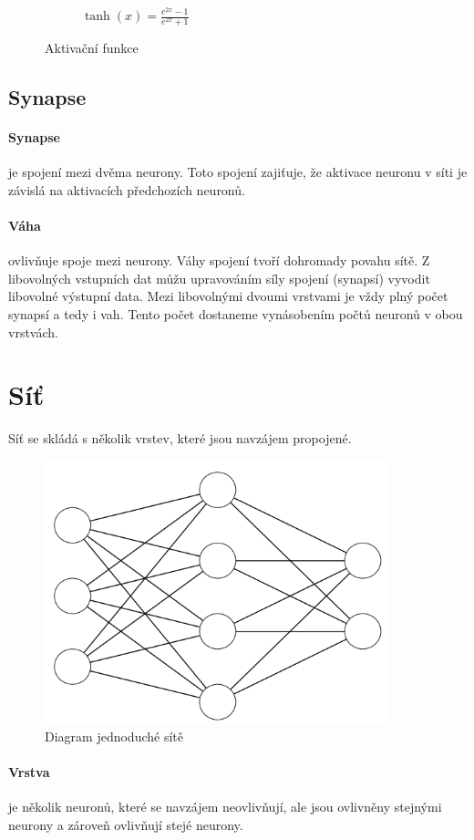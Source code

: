 \documentclass[12pt,a4paper]{report}
\begin{document}
\begin{figure}
\begin{subfigure}[h]{0.3\textwidth}
				\caption{$\tanh(x)=\frac{e^{2x}-1}{e^{2x}+1}$}
				\label{fig:hyperbolic tangent}
			\end{subfigure}
			\caption{Aktivační funkce}\label{fig:activation functions}
		\end{figure}
	\subsection{Synapse}
		\paragraph{Synapse} je spojení mezi dvěma neurony. Toto spojení zajiťuje, že aktivace neuronu v síti je závislá na aktivacích předchozích neuronů.
		\paragraph{Váha}
		ovlivňuje spoje mezi neurony. Váhy spojení tvoří dohromady povahu sítě. Z libovolných vstupních dat můžu upravováním síly spojení (synapsí) vyvodit libovolné výstupní data. Mezi libovolnými dvoumi vrstvami je vždy plný počet synapsí a tedy i vah. Tento počet dostaneme vynásobením počtů neuronů v obou vrstvách.
\section{Síť}
	Síť se skládá s několik vrstev, které jsou navzájem propojené.
	\begin{figure}[h]
		\centering
		\includegraphics[width=10cm]{nn3-4-2}
		\caption{Diagram jednoduché sítě}
	\end{figure}
	\paragraph{Vrstva}
	je několik neuronů, které se navzájem neovlivňují, ale jsou ovlivněny stejnými neurony a zároveň ovlivňují stejé neurony.
\end{document}
